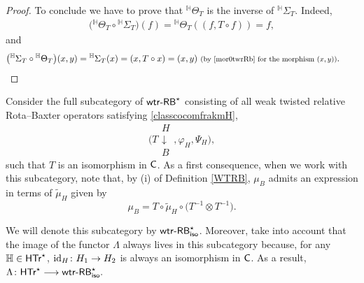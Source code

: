 \documentclass[pdftex]{sigma}
\numberwithin{equation}{section}
\begin{document}
\begin{proof}
To conclude we have to prove that ${}^{\mathbb{H}}\Theta_{T}$ is the inverse of ${}^{\mathbb{H}}\Sigma_{T}$. Indeed,
\begin{align*}
\bigl({}^{\mathbb{H}}\Theta_{T}\circ {}^{\mathbb{H}}\Sigma_{T}\bigr)(f)={}^{\mathbb{H}}\Theta_{T}((f, T\circ f))=f,
\end{align*}
and
\begin{align*}
\bigl({}^{\mathbb{H}}\Sigma_{T}\circ{}^{\mathbb{H}}\Theta_{T}\bigr)(x,y)={}^{\mathbb{H}}\Sigma_{T}(x)=(x,T\circ x)=(x,y)\ \text{\footnotesize\textnormal{(by \eqref{mor0twrRb} for the morphism $(x,y)$)}}.
\tag*{\qed}
\end{align*}
\renewcommand{\qed}{}
\end{proof}

Consider the full subcategory of ${\sf wtr}\textnormal{-}{\sf RB}^{\star}$ consisting of all weak twisted relative Rota--Baxter operators satisfying \eqref{classcocomfrakmH},
\[
\Biggl(T\begin{array}{c}H\\\downarrow\\B\end{array},\varphi_{H},\Psi_{H}\biggr),
\]
 such that $T$ is an isomorphism in ${\sf C}$. As a first consequence, when we work with this subcategory, note that, by (i) of Definition \ref{WTRB}, $\mu_{B}$ admits an expression in terms of $\widetilde{\mu}_{H}$ given by
\begin{equation*}%
\mu_{B}=T\circ \widetilde{\mu}_{H}\circ\bigl(T^{-1}\otimes T^{-1}\bigr).
\end{equation*}

We will denote this subcategory by ${\sf wtr}\textnormal{-}{\sf RB}^{\star}_{{\sf iso}}$. Moreover, take into account that the image of the functor $\Lambda$ always lives in this subcategory because, for any $\mathbb{H}\in {\sf HTr}^{\star}$, ${\rm id}_{H}\colon H_{1}\rightarrow H_{2}$ is always an isomorphism in ${\sf C}$. As a result,
$\Lambda\colon \sf{HTr}^{\star}\longrightarrow {\sf wtr}\textnormal{-}{\sf RB}^{\star}_{{\sf iso}}.$
\end{document}
